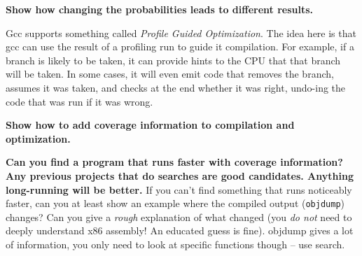 \documentclass{article}
\begin{document}
\textbf{Show how changing the probabilities leads to different results.}
\vspace{1cm}

Gcc supports something called \emph{Profile Guided Optimization}. The idea
here is that gcc can use the result of a profiling run to guide it
compilation. For example, if a branch is likely to be taken, it can provide
hints to the CPU that that branch will be taken. In some cases, it will even
emit code that removes the branch, assumes it was taken, and checks at the end
whether it was right, undo-ing the code that was run if it was wrong.

\textbf{Show how to add coverage information to compilation and optimization.}

\textbf{Can you find a program that runs faster with coverage information? Any
  previous projects that do searches are good candidates. Anything
  long-running will be better.}
If you can't find something that runs noticeably faster, can you at least show
an example where the compiled output (\texttt{objdump}) changes? Can you give
a \emph{rough} explanation of what changed (you \emph{do not} need to deeply
understand x86 assembly! An educated guess is fine). objdump gives a lot of
information, you only need to look at specific functions though -- use search.
\end{document}
